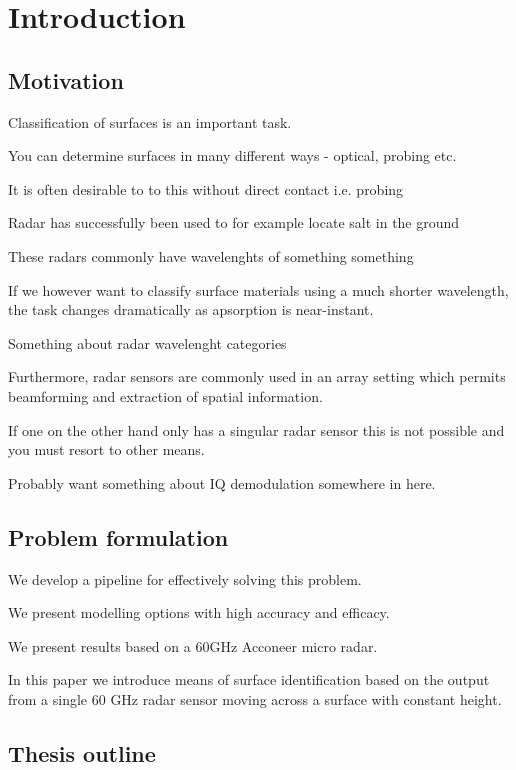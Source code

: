 \documentclass[a4paper, 12pt]{article}
\begin{document}
\section{Introduction}


\subsection{Motivation}

Classification of surfaces is an important task.

You can determine surfaces in many different ways - optical, probing etc.

It is often desirable to to this without direct contact i.e. probing

Radar has successfully been used to for example locate salt in the ground

These radars commonly have wavelenghts of something something

If we however want to classify surface materials using a much shorter wavelength, the task changes dramatically as apsorption is near-instant. 

Something about radar wavelenght categories

Furthermore, radar sensors are commonly used in an array setting which permits beamforming and extraction of spatial information. 

If one on the other hand only has a singular radar sensor this is not possible and you must resort to other means.

Probably want something about IQ demodulation somewhere in here.

\subsection{Problem formulation}

We develop a pipeline for effectively solving this problem. 

We present modelling options with high accuracy and efficacy. 

We present results based on a 60GHz Acconeer micro radar. 

In this paper we introduce means of surface identification based on the output from a single 60 GHz radar sensor moving across a surface with constant height. 

\subsection{Thesis outline}
\end{document}
